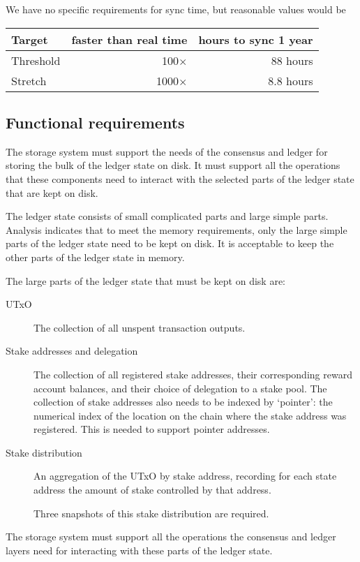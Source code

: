 \documentclass[11pt,a4paper]{article}
\begin{document}
We have no specific requirements for sync time, but reasonable values would be
\begin{center}
\begin{tabular}[]{lrr}
  Target    & faster than real time & hours to sync 1 year \\
  \toprule
  Threshold &  100$\times$ &  88 hours \\
  Stretch   & 1000$\times$ & 8.8 hours
\end{tabular}
\end{center}


\subsection{Functional requirements}
\label{functional-requirements}

The storage system must support the needs of the consensus and ledger for
storing the bulk of the ledger state on disk. It must support all the operations
that these components need to interact with the selected parts of the ledger
state that are kept on disk.

The ledger state consists of small complicated parts and large simple parts.
Analysis indicates that to meet the memory requirements, only the large simple
parts of the ledger state need to be kept on disk. It is acceptable to keep the
other parts of the ledger state in memory.

The large parts of the ledger state that must be kept on disk are:
\begin{description}
\item[UTxO]
    The collection of all unspent transaction outputs.
\item[Stake addresses and delegation]
    The collection of all registered stake addresses, their corresponding
    reward account balances, and their choice of delegation to a stake pool.
    The collection of stake addresses also needs to be indexed by `pointer':
    the numerical index of the location on the chain where the stake address
    was registered. This is needed to support pointer addresses.
\item[Stake distribution]
    An aggregation of the UTxO by stake address, recording for each state
    address the amount of stake controlled by that address.

    Three snapshots of this stake distribution are required.
\end{description}
The storage system must support all the operations the consensus and ledger
layers need for interacting with these parts of the ledger state.
\end{document}
